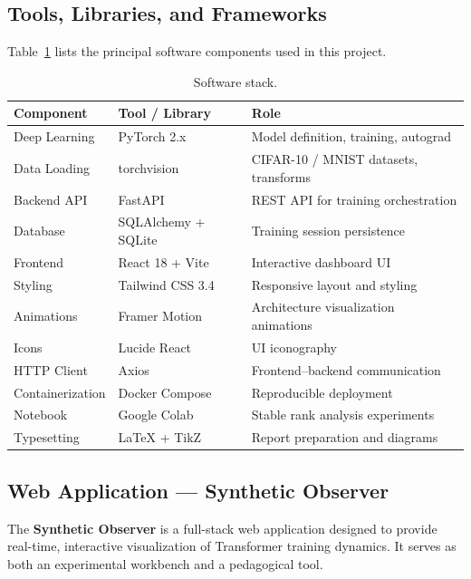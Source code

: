 \documentclass[12pt, a4paper]{article}
\begin{document}
\subsection{Tools, Libraries, and Frameworks}

Table~\ref{tab:tools} lists the principal software components used in
this project.

\begin{table}[H]
\centering
\caption{Software stack.}
\label{tab:tools}
\begin{tabular}{@{}lll@{}}
\toprule
\textbf{Component} & \textbf{Tool / Library} & \textbf{Role} \\
\midrule
Deep Learning   & PyTorch 2.x       & Model definition, training, autograd \\
Data Loading    & torchvision       & CIFAR-10 / MNIST datasets, transforms \\
Backend API     & FastAPI           & REST API for training orchestration \\
Database        & SQLAlchemy + SQLite & Training session persistence \\
Frontend        & React 18 + Vite   & Interactive dashboard UI \\
Styling         & Tailwind CSS 3.4  & Responsive layout and styling \\
Animations      & Framer Motion     & Architecture visualization animations \\
Icons           & Lucide React      & UI iconography \\
HTTP Client     & Axios             & Frontend--backend communication \\
Containerization & Docker Compose   & Reproducible deployment \\
Notebook        & Google Colab      & Stable rank analysis experiments \\
Typesetting     & \LaTeX{} + TikZ   & Report preparation and diagrams \\
\bottomrule
\end{tabular}
\end{table}

\subsection{Web Application --- Synthetic Observer}

The \textbf{Synthetic Observer} is a full-stack web application designed
to provide real-time, interactive visualization of Transformer training
dynamics. It serves as both an experimental workbench and a pedagogical
tool.
\end{document}
